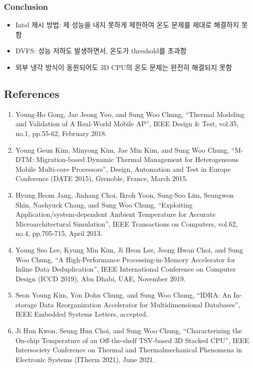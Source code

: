 \subsubsection*{Conclusion}
\begin{itemize}
    \item Intel 제시 방법: 제 성능을 내지 못하게 제한하여 온도 문제를 제대로 해결하지 못함
    \item DVFS: 성능 저하도 발생하면서, 온도가 threshold를 초과함
    \item 외부 냉각 방식이 동원되어도 3D CPU의 온도 문제는 완전히 해결되지 못함
\end{itemize}

\subsection{References}
\begin{enumerate}
    \item Young-Ho Gong, Jae Jeong Yoo, and Sung Woo Chung, ``Thermal Modeling and Validation of A Real-World Mobile AP'', IEEE Design \& Test, vol.35, no.1, pp.55-62, February 2018.
    \item Young Geun Kim, Minyong Kim, Jae Min Kim, and Sung Woo Chung, ``M-DTM: Migration-based Dynamic Thermal Management for Heterogeneous Mobile Multi-core Processors'', Design, Automation and Test in Europe Conference (DATE 2015), Grenoble, France, March 2015.
    \item Hyung Beom Jang, Jinhang Choi, Ikroh Yoon, Sung-Soo Lim, Seungwon Shin, Naehyuck Chang, and Sung Woo Chung, ``Exploiting Application/system-dependent Ambient Temperature for Accurate Microarchitectural Simulation'', IEEE Transactions on Computers, vol.62, no.4, pp.705-715, April 2013.
    \item Young Seo Lee, Kyung Min Kim, Ji Heon Lee, Jeong Hwan Choi, and Sung Woo Chung, ``A High-Performance Processing-in-Memory Accelerator for Inline Data Deduplication'', IEEE International Conference on Computer Design (ICCD 2019), Abu Dhabi, UAE, November 2019.
    \item Seon Young Kim, Yon Dohn Chung, and Sung Woo Chung, ``IDRA: An In-storage Data Reorganization Accelerator for Multidimensional Databases'', IEEE Embedded Systems Letters, accepted.
    \item Ji Hun Kwon, Seung Hun Choi, and Sung Woo Chung, ``Characterizing the On-chip Temperature of an Off-the-shelf TSV-based 3D Stacked CPU'', IEEE Intersociety Conference on Thermal and Thermalmechanical Phenomena in Electronic Systems (ITherm 2021), June 2021.
\end{enumerate}
